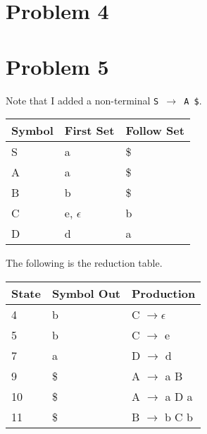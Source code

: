 \documentclass{article}
\providecommand{\prob}[1]{\section*{Problem #1}}
\begin{document}
    \prob{4}
    \pagebreak
    
    \prob{5}
    Note that I added a non-terminal \texttt{S $\to$ A \$}.
    \begin{center}
        \begin{tabular}{l|l|l}
            \textbf{Symbol} & \textbf{First Set} & \textbf{Follow Set}\\ \hline
            S & a             & \$ \\
            A & a             & \$ \\
            B & b             & \$ \\
            C & e, $\epsilon$ & b \\
            D & d             & a \\
        \end{tabular}
    \end{center}

    The following is the reduction table.
    \begin{center}
        \begin{tabular}{l|l|l}
            \textbf{State} & \textbf{Symbol Out} & \textbf{Production} \\ \hline
            4  & b  & C $\to \epsilon$ \\
            5  & b  & C $\to$ e        \\
            7  & a  & D $\to$ d        \\
            9  & \$ & A $\to$ a B      \\
            10 & \$ & A $\to$ a D a    \\
            11 & \$ & B $\to$ b C b    \\
        \end{tabular}
    \end{center}
\end{document}
